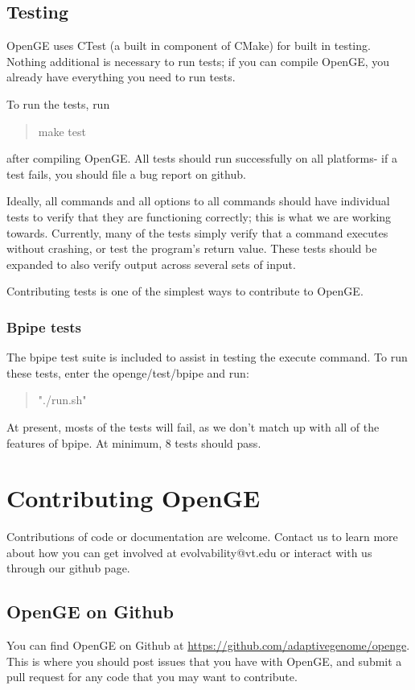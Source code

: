 \documentclass[11pt]{article}
\newcommand {\cmd}[1] {\begin{quote}#1\end{quote}}
\begin{document}
\subsection{Testing}
OpenGE uses CTest (a built in component of CMake) for built in testing. Nothing additional is necessary to run tests; if you can compile OpenGE, you already have everything you need to run tests.

To run the tests,  run
\cmd {make test}
after compiling OpenGE. All tests should run successfully on all platforms- if a test fails, you should file a bug report on github.

Ideally, all commands and all options to all commands should have individual tests to verify that they are functioning correctly; this is what we are working towards. Currently, many of the tests simply verify that a command executes without crashing, or test the program's return value. These tests should be expanded to also verify output across several sets of input.

Contributing tests is one of the simplest ways to contribute to OpenGE.

\subsubsection{Bpipe tests}
The bpipe test suite is included to assist in testing the execute command. To run these tests, enter the openge/test/bpipe and run:
\cmd{"./run.sh"}

At present, mosts of the tests will fail, as we don't match up with all of the features of bpipe. At minimum, 8 tests should pass.

\section {Contributing OpenGE}
Contributions of code or documentation are welcome. Contact us to learn more about how you can get involved at evolvability@vt.edu or interact with us through our github page.

\subsection {OpenGE on Github}
You can find OpenGE on Github at \url{https://github.com/adaptivegenome/openge}. This is where you should post issues that you have with OpenGE, and submit a pull request for any code that you may want to contribute.
\end{document}
